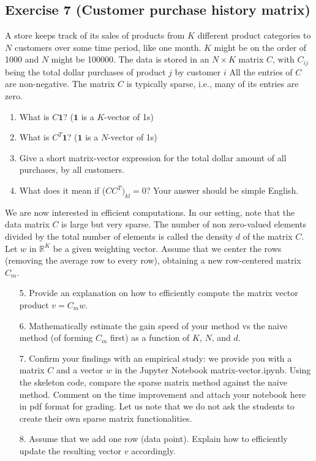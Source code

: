 \documentclass[11pt]{article}
\begin{document}
\newpage
\subsection*{Exercise 7 (Customer purchase history matrix)}

A store keeps track of its sales of products from $K$ different
product categories to $N$ customers over some time period, like one month. $K$ might be on the order of 1000 and $N$ might be 100000. The data is stored in an $N \times K$ matrix $C$, with $C_{ij}$ being the total dollar purchases of product $j$ by customer $i$ All the entries of $C$ are non-negative. The matrix $C$ is typically sparse, i.e., many of its entries are zero.

\begin{enumerate}
    \item What is $C \boldsymbol{1}$? ($\boldsymbol{1}$ is a $K$-vector of 1s)

    \item What is $C^T \boldsymbol{1}$? ($\boldsymbol{1}$ is a $N$-vector of 1s)

    \item Give a short matrix-vector expression for the total dollar amount of all purchases, by all customers.

    \item What does it mean if ($CC^T)_{kl} = 0$? Your answer should be simple English.
\end{enumerate}

We are now interested in efficient computations. In our setting, note that the data matrix $C$ is large but very sparse. The number of non zero-valued elements divided by the total number of elements is called the density $d$ of the matrix $C$. Let $w$ in $\mathbb{R}^K$ be a given weighting vector. Assume that we center the rows (removing the average row to every row), obtaining a new row-centered matrix $C_m$.

\begin{enumerate}
    \item[5.] Provide an explanation on how to efficiently compute the matrix vector product $v = C_m w$.

    \item[6.] Mathematically estimate the gain speed of your method vs the naive method (of forming $C_m$ first) as a function of $K$, $N$, and $d$.

    \item[7.] Confirm your findings with an empirical study: we provide you with a matrix $C$ and a vector $w$ in the Jupyter Notebook matrix-vector.ipynb. Using the skeleton code, compare the sparse matrix method against the naive method. Comment on the time improvement and attach your notebook here in pdf format for grading. Let us note that we do not ask the students to create their own sparse matrix functionalities.

    \item[8.] Assume that we add one row (data point). Explain how to efficiently update the resulting vector $v$ accordingly.
\end{enumerate}
\end{document}
